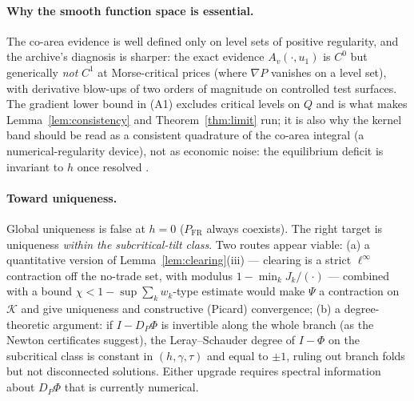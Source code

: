 \documentclass[11pt]{article}
\theoremstyle{definition}
\newcommand{\Kc}{\mathcal{K}}
\begin{document}
\paragraph{Why the smooth function space is essential.}
The co-area evidence is well defined only on level sets of positive
regularity, and the archive's diagnosis is sharper: the exact evidence
$A_v(\cdot,u_1)$ is $C^0$ but generically \emph{not} $C^1$ at Morse-critical
prices (where $\nabla P$ vanishes on a level set), with derivative blow-ups
of two orders of magnitude on controlled test surfaces. The gradient lower
bound in (A1) excludes critical levels on $Q$ and is what makes
Lemma~\ref{lem:consistency} and Theorem~\ref{thm:limit} run; it is also why
the kernel band should be read as a consistent quadrature of the co-area
integral (a numerical-regularity device), not as economic noise: the
equilibrium deficit is invariant to $h$ once resolved \cite{REZN}.

\paragraph{Toward uniqueness.}
Global uniqueness is false at $h=0$ ($P_{\mathrm{FR}}$ always coexists).
The right target is uniqueness \emph{within the subcritical-tilt class}.
Two routes appear viable: (a) a quantitative version of
Lemma~\ref{lem:clearing}(iii) — clearing is a strict $\ell^\infty$
contraction off the no-trade set, with modulus $1-\min_k J_k/(\cdot)$ —
combined with a bound $\chi<1-\sup\sum_kw_k$-type estimate would make
$\Psi$ a contraction on $\Kc$ and give uniqueness and constructive
(Picard) convergence; (b) a degree-theoretic argument: if
$I-D_P\Phi$ is invertible along the whole branch (as the Newton
certificates suggest), the Leray--Schauder degree of $I-\Phi$ on the
subcritical class is constant in $(h,\gamma,\tau)$ and equal to $\pm1$,
ruling out branch folds but not disconnected solutions. Either upgrade
requires spectral information about $D_P\Phi$ that is currently numerical.
\end{document}

